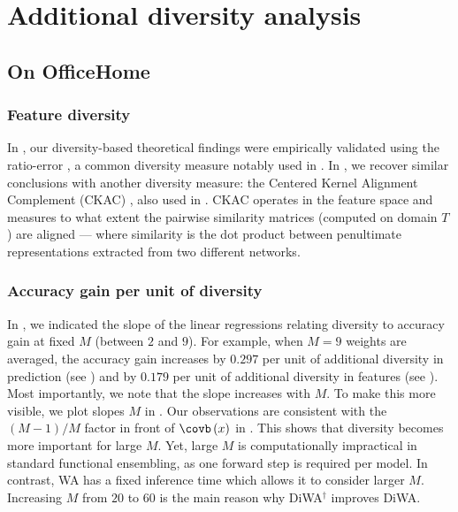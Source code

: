 

\section{Additional diversity analysis}%

\label{app:additional_diversity_analysis}
\subsection{On OfficeHome}

\subsubsection{Feature diversity}
\label{app:analysis_office_features}
In , our diversity-based theoretical findings were empirically validated using the ratio-error \cite{aksela2003comparison}, a common diversity measure notably used in \cite{rame2021dice,rame2021ixmo}.
In , we recover similar conclusions with another diversity measure: the Centered Kernel Alignment Complement (CKAC) \cite{DBLP:journals/corr/abs-1905-00414}, also used in \cite{Neyshabur2020,Wortsman2022robust}.
CKAC operates in the feature space and measures to what extent the pairwise similarity matrices (computed on domain $T$) are aligned --- where similarity is the dot product between penultimate representations extracted from two different networks.
%
\subsubsection{Accuracy gain per unit of diversity}
\label{app:soup:m_slope}
In , we indicated the slope of the linear regressions relating diversity to accuracy gain at fixed $M$ (between $2$ and $9$).
For example, when $M=9$ weights are averaged, the accuracy gain increases by $0.297$ per unit of additional diversity in prediction  \cite{aksela2003comparison} (see ) and by $0.179$ per unit of additional diversity in features \cite{DBLP:journals/corr/abs-1905-00414} (see ).
Most importantly, we note that the slope increases with $M$.
To make this more visible, we plot slopes \wrt $M$ in .
Our observations are consistent with the $(M-1)/M$ factor in front of $\covb\left(x\right)$ in .
This shows that diversity becomes more important for large $M$.
Yet, large $M$ is computationally impractical in standard functional ensembling, as one forward step is required per model.
In contrast, WA has a fixed inference time which allows it to consider larger $M$. Increasing $M$ from $20$ to $60$ is the main reason why DiWA$^{\dagger}$ improves DiWA.

